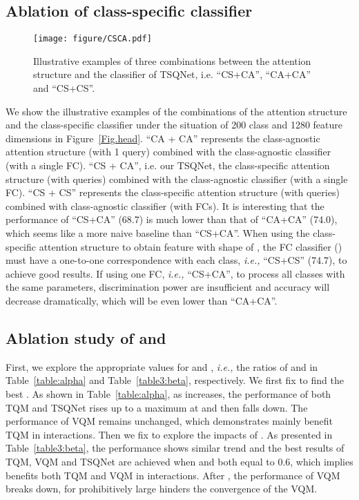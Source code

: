 \documentclass[runningheads]{llncs}
\newcommand{\tabref}[1]{Table~\ref{#1}}
\begin{document}
\subsection{Ablation of class-specific classifier}
\begin{figure}[h] \centering \texttt{[image: figure/CSCA.pdf]} \caption{Illustrative examples of three combinations between the attention structure and the classifier of TSQNet, {i.e.} ``CS+CA'', ``CA+CA'' and ``CS+CS''.} 

\end{figure}
We show the illustrative examples of the combinations of the attention structure and the class-specific classifier under the situation of 200 class and 1280 feature dimensions in Figure~\ref{Fig.head}. ``CA + CA'' represents the class-agnostic attention structure (with 1 query) combined with the class-agnostic classifier (with a single FC). ``CS + CA'', {i.e.} our TSQNet, the class-specific attention structure (with  queries) combined with the class-agnostic classifier (with a single FC). ``CS + CS'' represents the class-specific attention structure (with  queries) combined with class-agnostic classifier (with  FCs).
It is interesting that the performance of ``CS+CA'' (68.7) is much lower than that of ``CA+CA'' (74.0), which seems like a more naive baseline than ``CS+CA''. When using the class-specific attention structure to obtain feature with shape of , the FC classifier () must have a one-to-one correspondence with each class, \emph{i.e., } ``CS+CS'' (74.7), to achieve good results. If using one  FC, \emph{i.e., } ``CS+CA'', to process all classes with the same parameters, discrimination power are insufficient and accuracy will decrease dramatically, which will be even lower than ``CA+CA''.

\subsection{Ablation study of  and }
First, we explore the appropriate values for  and , \emph{i.e.,} the ratios of  and  in \tabref{table:alpha} and \tabref{table3:beta}, respectively. We first fix  to find the best . As shown in \tabref{table:alpha}, as  increases, the performance of both TQM and TSQNet rises up to a maximum at  and then falls down. The performance of VQM remains unchanged, which demonstrates  mainly benefit TQM in interactions. Then we fix  to explore the impacts of .  As presented in \tabref{table3:beta}, the performance shows similar trend and the best results of TQM, VQM and TSQNet are achieved when  and  both equal to 0.6, which implies   benefits both TQM and VQM in interactions. After , the performance of VQM breaks down, for prohibitively large  hinders the convergence of the VQM. 
\end{document}
